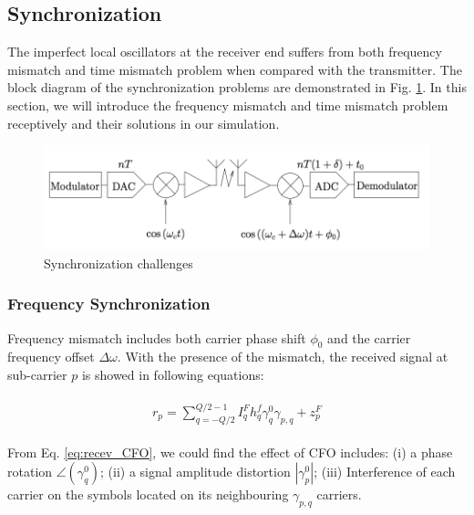 \documentclass[a4paper]{article}
\begin{document}
	\subsection{Synchronization}
	The imperfect local oscillators at the receiver end suffers from both frequency mismatch and time mismatch problem when compared with the transmitter. The block diagram of the synchronization problems are demonstrated in Fig. \ref{fig:sync_intro}. In this section, we will introduce the frequency mismatch and time mismatch problem receptively and their solutions in our simulation.
	
	\begin{figure}[h]
		\centering
		\includegraphics[scale=0.5]{figures/Sync_challenges.png}
		\vspace{-0.2cm}
		\centering
		\caption{Synchronization challenges}
		\label{fig:sync_intro}
	\end{figure}
	
	\subsubsection{Frequency Synchronization}
	Frequency mismatch includes both carrier phase shift $\phi_0$ and the carrier frequency offset $\Delta \omega$. With the presence of the mismatch, the received signal at sub-carrier $p$ is showed in following equations:
	
	\begin{align} 
		\begin{split}
			r_{p} = \sum_{q=-Q/2}^{Q/2-1} I_q^F h^f_q \gamma^0_q \gamma_{p,q} + z_p^F 
		\end{split}
		\label{eq:recev_CFO}
	\end{align}
	
	From Eq. \ref{eq:recev_CFO}, we could find the effect of CFO includes: (i) a phase rotation $\angle (\gamma_q^0)$; (ii) a signal amplitude distortion $|\gamma^0_p|$; (iii) Interference of each carrier on the symbols located on its neighbouring $\gamma_{p,q}$ carriers.
	
\end{document}
